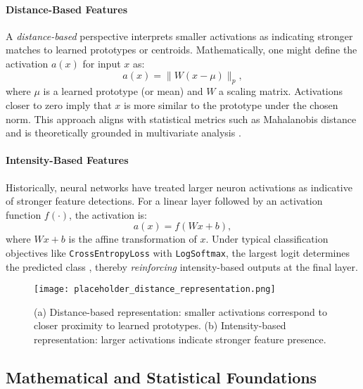\documentclass{article}
\begin{document}
\paragraph{Distance-Based Features}
A \emph{distance-based} perspective interprets smaller activations as indicating stronger matches to learned prototypes or centroids. Mathematically, one might define the activation $a(x)$ for input $x$ as:
\begin{equation}
    a(x) = \|W(x - \mu)\|_p,
    \label{eq:distance-based}
\end{equation}
where $\mu$ is a learned prototype (or mean) and $W$ a scaling matrix. Activations closer to zero imply that $x$ is more similar to the prototype under the chosen norm. This approach aligns with statistical metrics such as Mahalanobis distance and is theoretically grounded in multivariate analysis \cite{bishop2006pattern}.

\paragraph{Intensity-Based Features}
Historically, neural networks have treated larger neuron activations as indicative of stronger feature detections. For a linear layer followed by an activation function $f(\cdot)$, the activation is:
\begin{equation}
    a(x) = f(Wx + b),
    \label{eq:intensity-based}
\end{equation}
where $Wx + b$ is the affine transformation of $x$. Under typical classification objectives like \texttt{CrossEntropyLoss} with \texttt{LogSoftmax}, the largest logit determines the predicted class \cite{goodfellow2016deep}, thereby \emph{reinforcing} intensity-based outputs at the final layer.

\begin{figure}[ht]
    \centering
    \texttt{[image: placeholder\_distance\_representation.png]}
    \caption{(a) Distance-based representation: smaller activations correspond to closer proximity to learned prototypes. 
    (b) Intensity-based representation: larger activations indicate stronger feature presence.}
    \label{fig:distance_representation}
\end{figure}

\subsection{Mathematical and Statistical Foundations}
\end{document}
